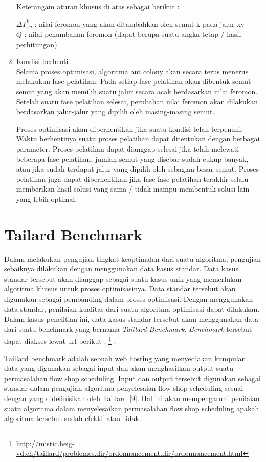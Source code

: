 \begin{enumerate}
	
	Keterangam aturan khusus di atas sebagai berikut :
	
	$\Delta T_{xy}^k$ : nilai feromon yang akan ditambahkan oleh semut k pada jalur xy\\
	$Q$ 				: nilai penambahan feromon (dapat berupa suatu angka tetap / hasil perhitungan)\\
	
	\item Kondisi berhenti\\
	Selama proses optimisasi, algoritma ant colony akan secara terus menerus melakukan fase pelatihan.
	Pada setiap fase pelatihan akan dibentuk semut-semut yang akan memilih suatu jalur secara acak
	berdasarkan nilai feromon. Setelah suatu fase pelatihan selesai, perubahan nilai feromon akan
	dilakukan berdasarkan jalur-jalur yang dipilih oleh masing-masing semut.
	
	Proses optimisasi akan diberhentikan jika suatu kondisi telah terpenuhi. Waktu berhentinya
	suatu proses pelatihan dapat ditentukan dengan berbagai parameter. Proses pelatihan dapat dianggap
	selesai jika telah melewati beberapa fase pelatihan, jumlah semut yang disebar sudah cukup
	banyak, atau jika sudah terdapat jalur yang dipilih oleh sebagian besar semut. Proses pelatihan
	juga dapat diberhentikan jika fase-fase pelatihan terakhir selalu memberikan hasil solusi yang sama
	/ tidak mampu membentuk solusi lain yang lebih optimal.
\end{enumerate}

\section{Tailard Benchmark}
Dalam melakukan pengujian tingkat keoptimalan dari suatu algoritma, pengujian sebaiknya dilakukan dengan menggunakan data kasus standar. Data kasus standar tersebut akan dianggap sebagai suatu kasus unik yang memerlukan algoritma khusus untuk proses optimisasinya. Data standar tersebut akan digunakan sebagai pembanding dalam proses optimisasi. 
Dengan menggunakan data	standar, penilaian kualitas dari suatu algoritma optimisasi dapat dilakukan. Dalam kasus penelitian ini, data kasus standar tersebut akan menggunakan data dari suatu benchmark yang bernama {\it Taillard Benchmark}. {\it Benchmark} tersebut dapat diakses lewat url berikut : \footnote{\label{Tailard}\url{http://mistic.heig-vd.ch/taillard/problemes.dir/ordonnancement.dir/ordonnancement.html} } .

Taillard benchmark adalah sebuah web hosting yang menyediakan kumpulan data yang digunakan sebagai input dan akan menghasilkan output suatu permasalahan flow shop scheduling. Input dan output tersebut digunakan sebagai standar dalam pengujian algoritma penyelesaian flow shop
scheduling sesuai dengan yang didefinisikan oleh Taillard [9]. Hal ini akan mempengaruhi penilaian suatu algoritma dalam menyelesaikan permasalahan flow shop scheduling apakah algoritma tersebut sudah efektif atau tidak.

